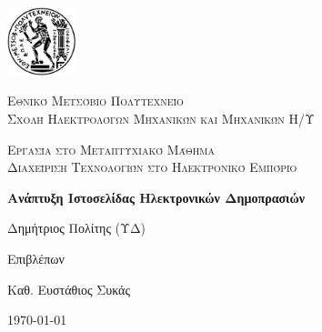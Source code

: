 \documentclass[12pt]{report}
\newcommand\blankpage{%
    \null
    \thispagestyle{empty}%
    \addtocounter{page}{-1}%
    \newpage}
\begin{document}

\hypersetup{pageanchor=false}

\begin{titlepage}
  \centering
  \includegraphics[width=0.15\textwidth]{pyrforos}\par\vspace{1cm}
  {\scshape\LARGE Εθνικό Μετσόβιο Πολυτεχνείο\\
  Σχολή Ηλεκτρολόγων Μηχανικών και Μηχανικών Η/Υ\par}
  \vspace{1cm}
  {\scshape\Large Εργασία στο Μεταπτυχιακό Μάθημα\\
  Διαχείριση Τεχνολογιών στο Ηλεκτρονικό Εμπόριο\par}
  \vspace{1.5cm}
  {\Large\bfseries Ανάπτυξη Ιστοσελίδας Ηλεκτρονικών Δημοπρασιών\par}
  \vspace{2cm}
  {\large Δημήτριος Πολίτης (ΥΔ)\par}
  \vfill
  Επιβλέπων \par
  Καθ. Ευστάθιος Συκάς

  \vfill

  {\large \today\par}
  \afterpage{\blankpage}
\end{titlepage}

\tableofcontents
\thispagestyle{empty}

\listoftables
\thispagestyle{empty}

\listoffigures
\thispagestyle{empty}

\begin{abstract}
Στο παρόν παρουσιάζεται η λειτουργία και η διαδικασία ανάπτυξης μιας ιστοσελίδας δημοπρασιών. Αρχικά  γίνεται αναφορά στις βασικές έννοιες του ηλεκτρονικού εμπορίου Παρουσιάζονται αρχικά τα διαθέσιμα λογισμικά, τα πλεονεκτήματα και μειονεκτήματά τους και στη συνέχεια περιγράφεται αναλυτικά η διαδικασία δημιουργίας ενός ιστοτόπου ηλεκτρονικών δημοπρασιών με τη χρήση αυτοματοποιημένων εργαλείων (\textlatin{phpProBid, vagrant}).

\vspace{10mm}

\noindent \textbf{Λέξεις κλειδιά:} Ηλεκτρονικό Εμπόριο, Ηλεκτρονική Δημοπρασία, Ανοιχτός Κώδικας, Εξυπηρετητής Ιστοσελίδων, Διαδίκτυο.
\end{abstract}
\end{document}
